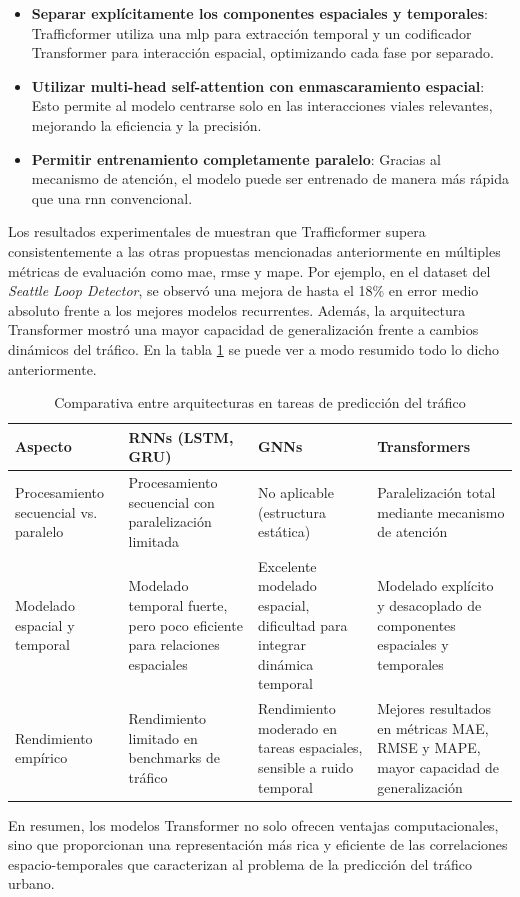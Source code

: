 \begin{itemize}
	\item \textbf{Separar explícitamente los componentes espaciales y temporales}: Trafficformer utiliza una \acrshort{mlp} para extracción temporal y un codificador Transformer para interacción espacial, optimizando cada fase por separado.
	\item \textbf{Utilizar multi-head self-attention con enmascaramiento espacial}: Esto permite al modelo centrarse solo en las interacciones viales relevantes, mejorando la eficiencia y la precisión.
	\item \textbf{Permitir entrenamiento completamente paralelo}: Gracias al mecanismo de atención, el modelo puede ser entrenado de manera más rápida que una \acrshort{rnn} convencional.
\end{itemize}

Los resultados experimentales de \cite{trafficformer} muestran que Trafficformer supera consistentemente a las otras propuestas mencionadas anteriormente en múltiples métricas de evaluación como \acrshort{mae}, \acrshort{rmse} y \acrshort{mape}. Por ejemplo, en el dataset del \textit{Seattle Loop Detector}, se observó una mejora de hasta el 18\% en error medio absoluto frente a los mejores modelos recurrentes. Además, la arquitectura Transformer mostró una mayor capacidad de generalización frente a cambios dinámicos del tráfico. En la tabla \ref{tab:comparativa_modelos} se puede ver a modo resumido todo lo dicho anteriormente.

\begin{table}[H]
	\centering
	\caption{Comparativa entre arquitecturas en tareas de predicción del tráfico}
	\label{tab:comparativa_modelos}
	\renewcommand{\arraystretch}{1.4}
	\begin{tabularx}{\textwidth}{lXXX}
		\toprule
		\textbf{Aspecto} & \textbf{RNNs (LSTM, GRU)} & \textbf{GNNs} & \textbf{Transformers} \\
		\midrule
		Procesamiento secuencial vs. paralelo &
		Procesamiento secuencial con paralelización limitada &
		No aplicable (estructura estática) &
		Paralelización total mediante mecanismo de atención \\
		
		\midrule
		Modelado espacial y temporal &
		Modelado temporal fuerte, pero poco eficiente para relaciones espaciales &
		Excelente modelado espacial, dificultad para integrar dinámica temporal &
		Modelado explícito y desacoplado de componentes espaciales y temporales \\
		
		\midrule
		Rendimiento empírico &
		Rendimiento limitado en benchmarks de tráfico &
		Rendimiento moderado en tareas espaciales, sensible a ruido temporal &
		Mejores resultados en métricas MAE, RMSE y MAPE, mayor capacidad de generalización \\
		\bottomrule
	\end{tabularx}
\end{table}

En resumen, los modelos Transformer no solo ofrecen ventajas computacionales, sino que proporcionan una representación más rica y eficiente de las correlaciones espacio-temporales que caracterizan al problema de la predicción del tráfico urbano. 